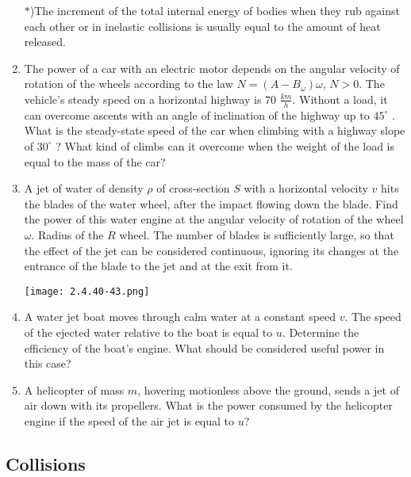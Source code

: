 \documentclass{article}
\begin{document}
\begin{enumerate}[label=2.4.\arabic*]
$\ast$)The increment of the total internal energy of bodies when they rub against each other or in inelastic collisions is usually equal to the amount of heat released.

\item The power of a car with an electric motor depends on the angular velocity of rotation of the wheels according to the law $N = (A - B_{\omega})\omega$, $N > 0$. The vehicle's steady speed on a horizontal highway is $70$ $\frac{km}{h}$. Without a load, it can overcome ascents with an angle of inclination of the highway up to $45^\circ$ . What is the steady-state speed of the car when climbing with a highway slope of $30^\circ$ ? What kind of climbs can it overcome when the weight of the load is equal to the mass of the car?



\item A jet of water of density $\rho$ of cross-section $S$ with a horizontal velocity $v$ hits the blades of the water wheel, after the impact flowing down the blade. Find the power of this water engine at the angular velocity of rotation of the wheel $\omega$. Radius of the $R$ wheel. The number of blades is sufficiently large, so that the effect of the jet can be considered continuous, ignoring its changes at the entrance of the blade to the jet and at the exit from it.

\begin{center}
    \texttt{[image: 2.4.40-43.png]}
\end{center}


\item A water jet boat moves through calm water at a constant speed $v$. The speed of the ejected water relative to the boat is equal to $u$. Determine the efficiency of the boat's engine. What should be considered useful power in this case?

\item A helicopter of mass $m$, hovering motionless above the ground, sends a jet of air down with its propellers. What is the power consumed by the helicopter engine if the speed of the air jet is equal to $u$?


\end{enumerate}


\subsection{Collisions}
\end{document}
